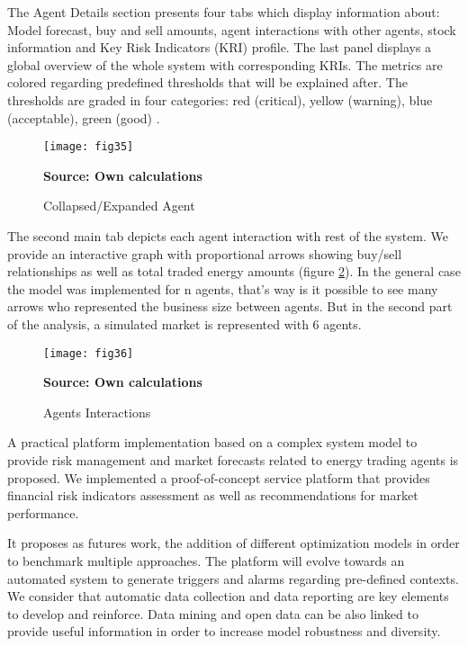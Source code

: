 \documentclass[12pt]{book}
\begin{document}
The Agent Details section presents four tabs which display information about: Model forecast, buy and sell amounts, agent interactions with other agents, stock information and Key Risk Indicators (KRI) profile. The last panel displays a global overview of the whole system with corresponding KRIs. The metrics are colored regarding predefined thresholds that will be explained after. The thresholds are graded in four categories: red (critical), yellow (warning), blue (acceptable), green (good) \cite{beasley2010} \cite{sioshansi2002}.

\begin{figure}  
\centering    
\texttt{[image: fig35]}  
\caption{Collapsed/Expanded Agent}
\scriptsize 
\textbf{Source: Own calculations}
\captionsetup{justification=centering,margin=1cm}   
\label{Fig 35}
\end{figure}

The second main tab depicts each agent interaction with rest of the system. We provide an interactive graph with proportional arrows showing buy/sell relationships as well as total traded energy amounts (figure \ref{Fig 36}). In the general case the model was implemented for n agents, that's way is it possible to see many arrows who represented the business size between agents. But in the second part of the analysis, a simulated market is represented with 6 agents.

\begin{figure}  
\centering    
\texttt{[image: fig36]}  
\caption{Agents Interactions}
\scriptsize 
\textbf{Source: Own calculations}
\captionsetup{justification=centering,margin=1cm}   
\label{Fig 36}
\end{figure}

A practical platform implementation based on a complex system model to provide risk management and market forecasts related to energy trading agents is proposed. We implemented a proof-of-concept service platform that provides financial risk indicators assessment as well as recommendations for market performance. 

It proposes as futures work, the addition of different optimization models in order to benchmark multiple approaches. The platform will evolve towards an automated system to generate triggers and alarms regarding pre-defined contexts. We consider that automatic data collection and data reporting are key elements to develop and reinforce. Data mining and open data can be also linked to provide useful information in order to increase model robustness and diversity.
\end{document}
